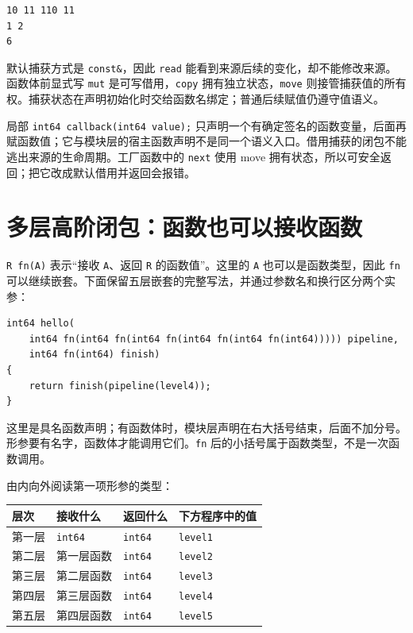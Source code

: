 \par
\medskip
\begin{lstlisting}[style=out]
10 11 110 11
1 2
6
\end{lstlisting}
\par
\medskip

默认捕获方式是 \texttt{const\&}，因此 \texttt{read} 能看到来源后续的变化，却不能修改来源。函数体前显式写 \texttt{mut} 是可写借用，\texttt{copy} 拥有独立状态，\texttt{move} 则接管捕获值的所有权。捕获状态在声明初始化时交给函数名绑定；普通后续赋值仍遵守值语义。

局部 \texttt{int64 callback(\allowbreak{}int64 value)\allowbreak{};} 只声明一个有确定签名的函数变量，后面再赋函数值；它与模块层的宿主函数声明不是同一个语义入口。借用捕获的闭包不能逃出来源的生命周期。工厂函数中的 \texttt{next} 使用 move 拥有状态，所以可安全返回；把它改成默认借用并返回会报错。

\section{多层高阶闭包：函数也可以接收函数}

\texttt{R fn(\allowbreak{}A)\allowbreak{}} 表示“接收 \texttt{A}、返回 \texttt{R} 的函数值”。这里的 \texttt{A} 也可以是函数类型，因此 \texttt{fn} 可以继续嵌套。下面保留五层嵌套的完整写法，并通过参数名和换行区分两个实参：

\par
\medskip
\begin{lstlisting}[style=chali]
int64 hello(
    int64 fn(int64 fn(int64 fn(int64 fn(int64 fn(int64))))) pipeline,
    int64 fn(int64) finish)
{
    return finish(pipeline(level4));
}
\end{lstlisting}
\par
\medskip

这里是具名函数声明；有函数体时，模块层声明在右大括号结束，后面不加分号。形参要有名字，函数体才能调用它们。\texttt{fn} 后的小括号属于函数类型，不是一次函数调用。

由内向外阅读第一项形参的类型：

\begin{center}
\begin{tabular}{llll}
\toprule
层次 & 接收什么 & 返回什么 & 下方程序中的值 \\
\midrule
第一层 & \texttt{int64} & \texttt{int64} & \texttt{level1} \\
第二层 & 第一层函数 & \texttt{int64} & \texttt{level2} \\
第三层 & 第二层函数 & \texttt{int64} & \texttt{level3} \\
第四层 & 第三层函数 & \texttt{int64} & \texttt{level4} \\
第五层 & 第四层函数 & \texttt{int64} & \texttt{level5} \\
\bottomrule
\end{tabular}
\end{center}

